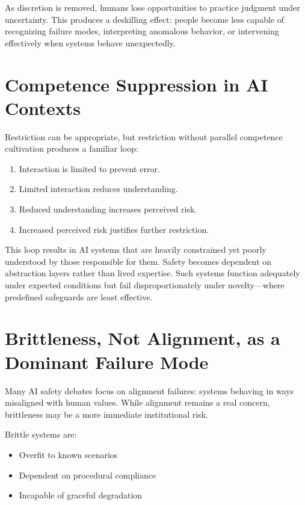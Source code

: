 \documentclass[11pt]{article}
\begin{document}
As discretion is removed, humans lose opportunities to practice judgment under
uncertainty. This produces a deskilling effect: people become less capable of
recognizing failure modes, interpreting anomalous behavior, or intervening effectively
when systems behave unexpectedly.

\section{Competence Suppression in AI Contexts}

Restriction can be appropriate, but restriction without parallel competence cultivation
produces a familiar loop:

\begin{enumerate}
  \item Interaction is limited to prevent error.
  \item Limited interaction reduces understanding.
  \item Reduced understanding increases perceived risk.
  \item Increased perceived risk justifies further restriction.
\end{enumerate}

This loop results in AI systems that are heavily constrained yet poorly understood by
those responsible for them. Safety becomes dependent on abstraction layers rather than
lived expertise. Such systems function adequately under expected conditions but fail
disproportionately under novelty---where predefined safeguards are least effective.

\section{Brittleness, Not Alignment, as a Dominant Failure Mode}

Many AI safety debates focus on alignment failures: systems behaving in ways misaligned
with human values. While alignment remains a real concern, brittleness may be a more
immediate institutional risk.

Brittle systems are:

\begin{itemize}
  \item Overfit to known scenarios
  \item Dependent on procedural compliance
  \item Incapable of graceful degradation
\end{itemize}
\end{document}
